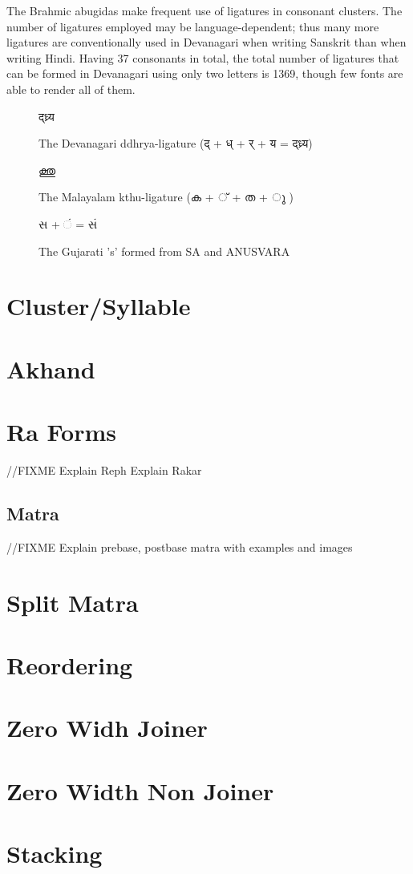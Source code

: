 The Brahmic abugidas make frequent use of ligatures in consonant clusters. The number of ligatures employed may be language-dependent; thus many more ligatures are conventionally used in Devanagari when writing Sanskrit than when writing Hindi. Having 37 consonants in total, the total number of ligatures that can be formed in Devanagari using only two letters is 1369, though few fonts are able to render all of them.

\begin{figure}[h]
   \centering
   {\hindi\textexample द्ध्र्य }
   \caption{The Devanagari ddhrya-ligature {\hindi (द् + ध् + र् + य = द्ध्र्य) } }
\end{figure}

\begin{figure}[h]
   \centering
   {\malayalam\textexample  ക്തു}
   \caption{The Malayalam kthu-ligature {\malayalam (ക + ് + ത + ു ) } }
\end{figure}

\begin{figure}[h]
  \centering
  {\gujarati\textexample સ +  ં = સં}
  \caption{The Gujarati 's' formed from SA and ANUSVARA}
\end{figure}

\section{Cluster/Syllable }

\section{Akhand }

\section{Ra Forms }
//FIXME
Explain Reph
Explain Rakar

\subsection*{Matra}
//FIXME
Explain prebase, postbase matra with examples and images

\section{Split Matra }

\section{Reordering }

\section{Zero Widh Joiner }

\section{Zero Width Non Joiner }

\section{Stacking }

